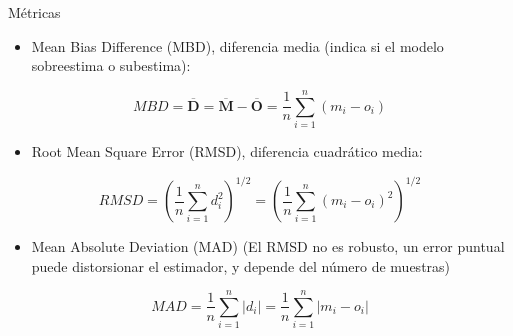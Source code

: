 \documentclass[xcolor={usenames,svgnames,dvipsnames}]{beamer}
\begin{document}
\begin{frame}[label={sec:org69e7bd0}]{Métricas}
\begin{itemize}
\item Mean Bias Difference (MBD), diferencia media (indica si el modelo sobreestima o subestima):
\end{itemize}
\[
MBD = \overline{\mathbf{D}} = \overline{\mathbf{M}} - \overline{\mathbf{O}} = \frac{1}{n} \sum_{i=1}^n (m_i - o_i)
\]

\begin{itemize}
\item Root Mean Square Error (RMSD), diferencia cuadrático media:
\end{itemize}
\[
RMSD = \left(\frac{1}{n} \sum_{i=1}^n d_i^2 \right)^{1/2} =  \left( \frac{1}{n} \sum_{i=1}^n (m_i - o_i)^2  \right)^{1/2}
\]

\begin{itemize}
\item Mean Absolute Deviation (MAD) (El RMSD no es robusto, un error puntual puede distorsionar el estimador, y depende del número de muestras)
\end{itemize}

\[
MAD = \frac{1}{n} \sum_{i=1}^n \left|d_i\right| =  \frac{1}{n} \sum_{i=1}^n \left|m_i - o_i\right|
\]
\end{frame}
\end{document}
